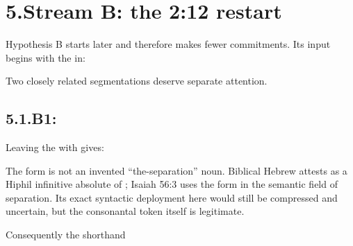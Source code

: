 \section*{5.\quad Stream B: the 2:12 restart}

Hypothesis B starts later and therefore makes fewer commitments.  Its input begins with the  in:


Two closely related segmentations deserve separate attention.

\subsection*{5.1.\quad B1: }

Leaving the  with  gives:


The form  is not an invented ``the-separation'' noun.  Biblical Hebrew attests  as a Hiphil infinitive absolute of ; Isaiah 56:3 uses the form in the semantic field of separation.\cite{BDB,JouonMuraoka2006}  Its exact syntactic deployment here would still be compressed and uncertain, but the consonantal token itself is legitimate.

Consequently the shorthand


